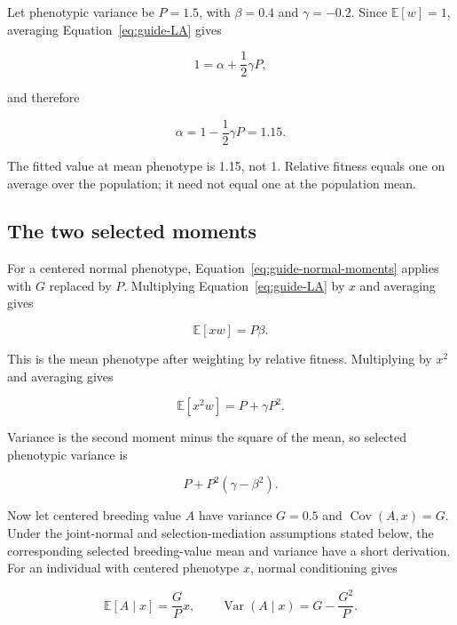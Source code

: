 \documentclass[11pt]{article}
\newcommand{\E}{\mathbb{E}}
\newcommand{\Var}{\operatorname{Var}}
\newcommand{\Cov}{\operatorname{Cov}}
\begin{document}
Let phenotypic variance be $P=1.5$, with $\beta=0.4$ and $\gamma=-0.2$.  Since
$\E[w]=1$, averaging Equation~\eqref{eq:guide-LA} gives

\begin{equation}
1=\alpha+\frac12\gamma P,
\end{equation}

and therefore

\begin{equation}
\alpha=1-\frac12\gamma P=1.15.
\label{eq:guide-intercept}
\end{equation}

The fitted value at mean phenotype is 1.15, not 1.  Relative fitness equals
one on average over the population; it need not equal one at the population
mean.

\subsection{The two selected moments}

For a centered normal phenotype, Equation~\eqref{eq:guide-normal-moments}
applies with $G$ replaced by $P$.  Multiplying Equation~\eqref{eq:guide-LA}
by $x$ and averaging gives

\begin{equation}
\E[xw]=P\beta.
\label{eq:guide-first-moment}
\end{equation}

This is the mean phenotype after weighting by relative fitness.  Multiplying
by $x^2$ and averaging gives

\begin{equation}
\E[x^2w]=P+\gamma P^2.
\label{eq:guide-second-moment}
\end{equation}

Variance is the second moment minus the square of the mean, so selected
phenotypic variance is

\begin{equation}
P+P^2(\gamma-\beta^2).
\end{equation}

Now let centered breeding value $A$ have variance $G=0.5$ and
$\Cov(A,x)=G$.  Under the joint-normal and selection-mediation assumptions
stated below, the corresponding selected breeding-value mean and variance
have a short derivation.  For an individual with centered phenotype $x$,
normal conditioning gives

\begin{equation}
\E[A\mid x]=\frac{G}{P}x,
\qquad
\Var(A\mid x)=G-\frac{G^2}{P}.
\label{eq:guide-conditional-A-one}
\end{equation}
\end{document}

